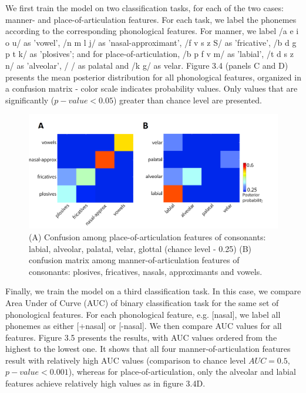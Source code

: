We first train the model on two classification tasks, for each of the two cases: manner- and place-of-articulation features. For each task, we label the phonemes according to the corresponding phonological features. For manner, we label /a e i o u/ as 'vowel', /n m l j/ as 'nasal-approximant', /f v s z S/ as 'fricative', /b d g p t k/ as 'plosives'; and for place-of-articulation, /b p f v m/ as 'labial', /t d s z n/ as 'alveolar', / / as palatal and /k g/ as velar. Figure 3.4 (panels C and D) presents the mean posterior distribution for all phonological features, organized in a confusion matrix - color scale indicates probability values. Only values that are significantly ($p-value<0.05$) greater than chance level are presented. 

\begin{figure}[h]
\vspace{.3in}
\includegraphics[width=\linewidth]{Figures/Ch3/Figure4_C.png}
\caption{(A) Confusion among place-of-articulation features of consonants: labial, alveolar, palatal, velar, glottal (chance level - 0.25) (B) confusion matrix among manner-of-articulation features of consonants: plosives, fricatives, nasals, approximants and vowels.}
\end{figure}

Finally, we train the model on a third classification task. In this case, we compare Area Under of Curve (AUC) of binary classification task for the same set of phonological features. For each phonological feature, e.g. [nasal], we label all phonemes as either [+nasal] or [-nasal]. We then compare AUC values for all features. Figure 3.5 presents the results, with AUC values ordered from the highest to the lowest one. It shows that all four manner-of-articulation features result with relatively high AUC values (comparison to chance level $AUC = 0.5$, $p-value<0.001$), whereas for place-of-articulation, only the alveolar and labial features achieve relatively high values as in figure 3.4D.

